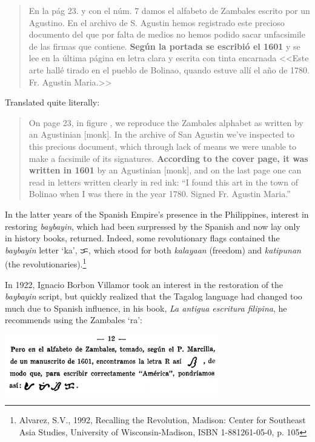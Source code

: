 \documentclass[a4paper,pagesize,openany,14pt,parskip=never]{scrbook}
\newcommand{\≈}{$\approx$}
\begin{document}
\begin{quote}
    En la p\'ag 23. y con el n\'um. 7 damos el alfabeto de Zambales escrito por un Agustino. En el archivo de S. Agustin hemos registrado este precioso documento del que por falta de medios no hemos podido sacar unfacsimile de las firmas que contiene. {\bfseries Seg\'un la portada se escribi\'o el 1601} y se lee en la \'ultima p\'agina en letra clara y escrita con tinta encarnada <<Este arte hall\'e tirado en el pueblo de Bolinao, quando estuve all\'i el a\~no de 1780. Fr. Agustin Maria.>>
\end{quote}

Translated quite literally:

\begin{quote}
    On page 23, in figure , we reproduce the Zambales alphabet as written by an Agustinian [monk]. In the archive of San Agustin we've inspected to this precious document, which through lack of means we were unable to make a facsimile of its signatures. {\bfseries According to the cover page, it was written in 1601} by an Agustinian [monk], and on the last page one can read in letters written clearly in red ink: ``I found this art in the town of Bolinao when I was there in the year 1780. Signed Fr. Agustin Maria.''
\end{quote}

In the latter years of the Spanish Empire's presence in the Philippines, interest in restoring {\em baybayin}, which had been surpressed by the Spanish and now lay only in history books, returned. Indeed, some revolutionary flags contained the {\em baybayin} letter `ka', {\baybayin ᜃ}, which stood for both {\em kalayaan} (freedom) and {\em katipunan} (the revolutionaries).\footnote{Alvarez, S.V., 1992, Recalling the Revolution, Madison: Center for Southeast Asia Studies, University of Wisconsin-Madison, ISBN 1-881261-05-0, p. 105} 

In 1922, Ignacio Borbon Villamor took an interest in the restoration of the {\em baybayin} script, but quickly realized that the Tagalog language had changed too much due to Spanish influence, in his book, {\em La antigua escritura filipina}, he recommends using the Zambales `ra':

\includegraphics[width=0.7\textwidth]{ZambalesRa1}
\end{document}
